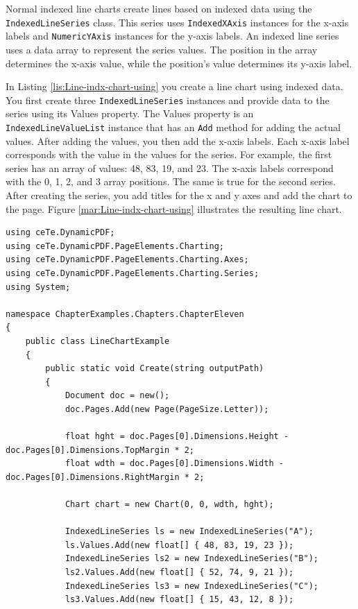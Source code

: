 \documentclass[american,letterpaper]{tufte-book}
\numberwithin{equation}{section}
\numberwithin{figure}{section}
\begin{document}
{Normal indexed line charts create lines based on indexed data using
the \texttt{IndexedLineSeries} class. This series uses \texttt{IndexedXAxis}
instances for the x-axis labels and \texttt{NumericYAxis} instances
for the y-axis labels. An indexed line series uses a data array to
represent the series values. The position in the array determines
the x-axis value, while the position’s value determines its y-axis
label. 

In Listing \ref{lis:Line-indx-chart-using} you create a line chart
using indexed data. You first create three \texttt{IndexedLineSeries}
instances and provide data to the series using its Values property.
The Values property is an \texttt{IndexedLineValueList} instance that
has an \texttt{Add} method for adding the actual values. After adding
the values, you then add the x-axis labels. Each x-axis label corresponds
with the value in the values for the series. For example, the first
series has an array of values: 48, 83, 19, and 23. The x-axis labels
correspond with the 0, 1, 2, and 3 array positions. The same is true
for the second series. After creating the series, you add titles for
the x and y axes and add the chart to the page. Figure \ref{mar:Line-indx-chart-using}
illustrates the resulting line chart.

\bgroup{}
\begin{lstlisting}[caption={Line chart using indexed data.},label={lis:Line-indx-chart-using},basicstyle={\small\ttfamily},breaklines=true]
using ceTe.DynamicPDF;
using ceTe.DynamicPDF.PageElements.Charting;
using ceTe.DynamicPDF.PageElements.Charting.Axes;
using ceTe.DynamicPDF.PageElements.Charting.Series;
using System;

namespace ChapterExamples.Chapters.ChapterEleven
{
    public class LineChartExample
    {
        public static void Create(string outputPath)
        {
            Document doc = new();
            doc.Pages.Add(new Page(PageSize.Letter));

            float hght = doc.Pages[0].Dimensions.Height - doc.Pages[0].Dimensions.TopMargin * 2;
            float wdth = doc.Pages[0].Dimensions.Width - doc.Pages[0].Dimensions.RightMargin * 2;

            Chart chart = new Chart(0, 0, wdth, hght);

            IndexedLineSeries ls = new IndexedLineSeries("A");
            ls.Values.Add(new float[] { 48, 83, 19, 23 });
            IndexedLineSeries ls2 = new IndexedLineSeries("B");
            ls2.Values.Add(new float[] { 52, 74, 9, 21 });
            IndexedLineSeries ls3 = new IndexedLineSeries("C");
            ls3.Values.Add(new float[] { 15, 43, 12, 8 });
                        

\end{lstlisting}}
\end{document}
